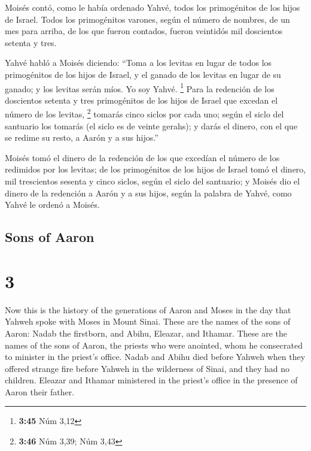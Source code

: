 \begin{paracol}{2}
 Moisés contó, como le había ordenado Yahvé, todos los
primogénitos de los hijos de Israel.  Todos los
primogénitos varones, según el número de nombres, de un mes para arriba,
de los que fueron contados, fueron veintidós mil doscientos setenta y
tres.

 Yahvé habló a Moisés diciendo:  ``Toma a
los levitas en lugar de todos los primogénitos de los hijos de Israel, y
el ganado de los levitas en lugar de su ganado; y los levitas serán
míos. Yo soy Yahvé. \footnote{\textbf{3:45} Núm 3,12} 
Para la redención de los doscientos setenta y tres primogénitos de los
hijos de Israel que excedan el número de los levitas, \footnote{\textbf{3:46}
  Núm 3,39; Núm 3,43}  tomarás cinco siclos por cada uno;
según el siclo del santuario los tomarás (el siclo es de veinte gerahs);
 y darás el dinero, con el que se redime su resto, a
Aarón y a sus hijos.''

 Moisés tomó el dinero de la redención de los que
excedían el número de los redimidos por los levitas;  de
los primogénitos de los hijos de Israel tomó el dinero, mil trescientos
sesenta y cinco siclos, según el siclo del santuario;  y
Moisés dio el dinero de la redención a Aarón y a sus hijos, según la
palabra de Yahvé, como Yahvé le ordenó a Moisés.

\switchcolumn
\begin{otherlanguage}{english}

\hypertarget{sons-of-aaron}{%
\subsection{Sons of Aaron}\label{sons-of-aaron}}

\hypertarget{section-5}{%
\section{3}\label{section-5}}

 Now this is the history of the generations of Aaron and
Moses in the day that Yahweh spoke with Moses in Mount Sinai.
 These are the names of the sons of Aaron: Nadab the
firstborn, and Abihu, Eleazar, and Ithamar.  These are the
names of the sons of Aaron, the priests who were anointed, whom he
consecrated to minister in the priest's office.  Nadab and
Abihu died before Yahweh when they offered strange fire before Yahweh in
the wilderness of Sinai, and they had no children. Eleazar and Ithamar
ministered in the priest's office in the presence of Aaron their father.


\end{otherlanguage}
\end{paracol}
